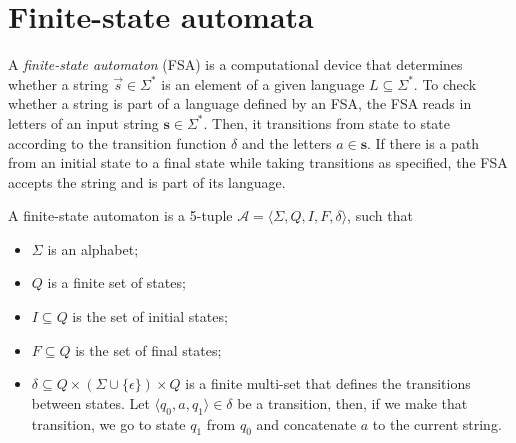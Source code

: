\section{Finite-state automata} \label{sec:fsa}



A \textit{finite-state automaton} (FSA) is a computational device that
determines whether a string $\vec{s}\in\Sigma^*$ is an element of a given
language $L\subseteq\Sigma^*$. To check whether a string is part of a language
defined by an FSA, the FSA reads in letters of an input string
$\bm{s}\in\Sigma^*$. Then, it transitions from state to state according to the
transition function $\delta$ and the letters $a\in\bm{s}$. If there is a path
from an initial state to a final state while taking transitions as specified,
the FSA accepts the string and is part of its language.


\begin{definition}
  A finite-state automaton is a 5-tuple $\mathcal{A}=\langle \Sigma, Q, I, F,
  \delta \rangle$, such that
  \begin{itemize}
    \item $\Sigma$ is an alphabet;
    \item $Q$ is a finite set of states;
    \item $I\subseteq Q$ is the set of initial states;
    \item $F\subseteq Q$ is the set of final states;
    \item $\delta\subseteq Q \times (\Sigma\cup\{\epsilon\}) \times Q$ is a
      finite multi-set that defines the transitions between states. Let
      $\langle q_0,a,q_1 \rangle\in\delta$ be a transition, then, if we make
      that transition, we go to state $q_1$ from $q_0$ and concatenate $a$ to
      the current string.
  \end{itemize}
\end{definition}

